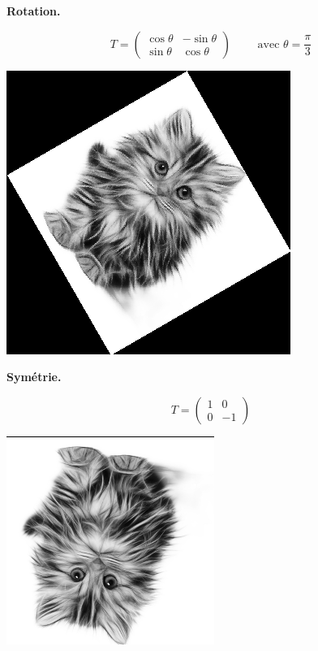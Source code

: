 \documentclass[11pt,class=report,crop=false]{standalone}
\begin{document}
\begin{activite}
\begin{enumerate}
	
	\begin{center}
		\begin{minipage}{0.4\textwidth}
		\textbf{Rotation.}
		
		$$T = \begin{pmatrix}\cos \theta& -\sin \theta\\\sin\theta&\cos\theta\end{pmatrix} \qquad \text{ avec } \theta = \frac\pi3$$	
		\end{minipage}
		\begin{minipage}{0.45\textwidth}\center
			\includegraphics[scale=\myscale,scale=0.3]{png/chat_rotation}
		\end{minipage}	
	\end{center}

	\begin{center}
	\begin{minipage}{0.4\textwidth}
		\textbf{Symétrie.}
		
		$$T = \begin{pmatrix}1&0\\0&-1\end{pmatrix}$$	
	\end{minipage}
	\begin{minipage}{0.45\textwidth}\center
		\includegraphics[scale=\myscale,scale=0.4]{png/chat_symetrie}
	\end{minipage}
	\end{center}


\end{enumerate}
\end{activite}
\end{document}

